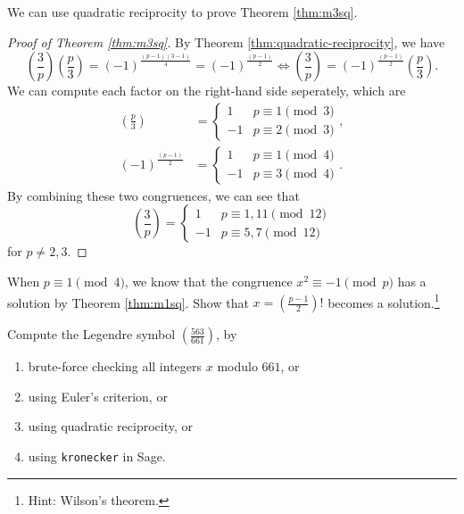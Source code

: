 We can use quadratic reciprocity to prove Theorem \ref{thm:m3sq}.
\begin{proof}[Proof of Theorem \ref{thm:m3sq}]
    By Theorem \ref{thm:quadratic-reciprocity}, we have
    \[
    \left(\frac{3}{p}\right) \left(\frac{p}{3}\right) = (-1)^{\frac{(p-1)(3-1)}{4}} = (-1)^{\frac{(p-1)}{2}} \Leftrightarrow \left(\frac{3}{p}\right) = (-1)^{\frac{(p-1)}{2}} \left(\frac{p}{3}\right).
    \]
    We can compute each factor on the right-hand side seperately, which are
    \begin{align*}
        \left(\frac{p}{3}\right) &= \begin{cases} 1 & p \equiv 1 \pmod{3} \\ -1 & p \equiv 2 \pmod{3} \end{cases}, \\
        (-1)^{\frac{(p-1)}{2}} &= \begin{cases} 1 & p \equiv 1 \pmod{4} \\ -1 & p \equiv 3 \pmod{4} \end{cases}.
    \end{align*}
    By combining these two congruences, we can see that
    \[
    \left(\frac{3}{p}\right) = \begin{cases}
        1 & p \equiv 1, 11 \pmod{12} \\
        -1 & p \equiv 5, 7 \pmod{12}
    \end{cases}
    \]
    for $p \neq 2, 3$.
\end{proof}

\begin{exercise}
    When $p \equiv 1 \pmod{4}$, we know that the congruence $x^2 \equiv -1 \pmod{p}$ has a solution by Theorem \ref{thm:m1sq}.
    Show that $x = \left(\frac{p-1}{2}\right)!$ becomes a solution.\footnote{Hint: Wilson's theorem.}
\end{exercise}

\begin{exercise}\sage Compute the Legendre symbol $\left(\frac{563}{661}\right)$, by
    \begin{enumerate}
        \item brute-force checking all integers $x$ modulo $661$, or
        \item using Euler's criterion, or
        \item using quadratic reciprocity, or
        \item using \texttt{kronecker} in Sage.
    \end{enumerate}
\end{exercise}

